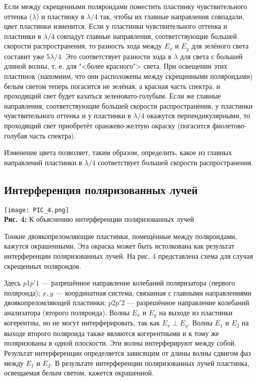\documentclass[12pt,a4paper]{scrartcl}
\begin{document}
	Если между скрещенными поляроидами поместить пластинку чувствительного оттенка
	($ \lambda $) и пластинку в $ \lambda/4 $ так, чтобы их главные
	направления совпадали, цвет пластинки изменится. Если у пластинки чувствительного оттенка и пластинки в $ \lambda/4  $ совпадут главные направления, соответствующие большей скорости распространения, то разность хода между $ E_x $ и $ E_y $ для зелёного света составит уже $ 5\lambda/4 $. Это соответствует разности хода в $ \lambda $ для света с большей длиной волны, т. е. для "<более красного"> света. При освещении
	этих пластинок (напомним, что они расположены между скрещенными поляроидами) белым светом теперь погасится не зелёная, а красная
	часть спектра, и проходящий свет будет казаться зеленовато-голубым.
	Если же главные направления, соответствующие большей скорости распространения, у пластинки чувствительного оттенка и у пластинки
	в $ \lambda/4 $ окажутся перпендикулярными, то проходящий свет приобретёт
	оранжево-желтую окраску (погасится фиолетово-голубая часть спектра).
	
	Изменение цвета позволяет, таким образом, определить, какое из
	главных направлений пластинки в $ \lambda/4 $ соответствует большей скорости
	распространения.
	
	
	\subsection{Интерференция поляризованных лучей}
	
	\begin{center}
		\texttt{[image: PIC\_4.png]}
		\\\textbf{Рис. 4:} К объяснению интерференции поляризованных лучей
	\end{center}
	
	Тонкие двоякопреломляющие пластинки, помещённые между поляроидами, кажутся окрашенными. Эта окраска может быть истолкована как результат интерференции поляризованных лучей. На рис. 4 представлена схема для
	случая скрещенных поляроидов.
	
	Здесь $ p1p'1 $ --- разрешённое направление колебаний поляризатора
	(первого поляроида); $ x, y $ --- координатная система, связанная с главными направлениями двоякопреломляющей пластинки; $ p2p'2 $ --- разрешённое направление колебаний анализатора (второго поляроида). Волны
	$ E_x  $ и $ E_y $ на выходе из пластинки когерентны, но не могут интерферировать, так как $ E_x \perp  E_y $. Волны $ E_1 $ и $ E_2 $ на выходе второго поляроида
	также являются когерентными и к тому же поляризованы в одной плоскости. Эти волны интерферируют между собой. Результат интерференции определяется зависящим от длины волны сдвигом фаз между $ E_1 $
	и $ E_2 $. В результате интерференции поляризованных лучей пластинка, освещаемая белым светом, кажется окрашенной.
	
\end{document}
